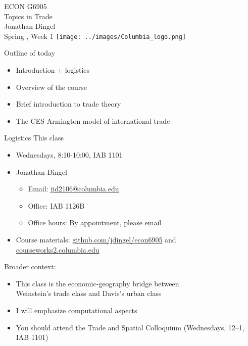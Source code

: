 \documentclass[10pt,notes=hide]{beamer}
\begin{document}
\begin{frame}[plain]
\begin{center}
\large
\textcolor{columbiadarkblue}{ECON G6905\\
Topics in Trade\\ 
Jonathan Dingel\\
Spring \the\year, Week 1}
\vfill 
\texttt{[image: ../images/Columbia\_logo.png]}
\end{center}
\end{frame}
\begin{frame}{Outline of today}
\begin{itemize}
	\item Introduction + logistics
	\item Overview of the course
	\item Brief introduction to trade theory
	\item The CES Armington model of international trade
\end{itemize}
\end{frame}
\begin{frame}{Logistics}
This class
\begin{itemize}
\item Wednesdays, 8:10-10:00, IAB 1101
\item Jonathan Dingel
\begin{itemize}
	\item Email: \href{mailto:jid2106@columbia.edu}{jid2106@columbia.edu}
	\item Office: IAB 1126B
	\item Office hours: By appointment, please email
\end{itemize}
\item Course materials:
\href{http://github.com/jdingel/econ6905}{github.com/jdingel/econ6905}
and \href{https://courseworks2.columbia.edu}{courseworks2.columbia.edu}
\end{itemize}
Broader context:
\begin{itemize}
\item This class is the economic-geography bridge between\\ Weinstein's trade class and Davis's urban class
\item I will emphasize computational aspects
\item You should attend the Trade and Spatial Colloquium (Wednesdays, 12--1, IAB 1101)
\end{itemize}
\end{frame}
\end{document}
